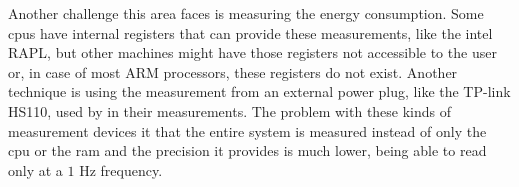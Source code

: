 Another challenge this area faces is measuring the energy consumption. Some \glspl{cpu} have internal registers that can provide these measurements, like the intel \gls{RAPL}, but other machines might have those registers not accessible to the user or, in case of most \gls{ARM} processors, these registers do not exist. Another technique is using the measurement from an external power plug, like the TP-link HS110, used by \textcite{meassuring-jit} in their measurements. The problem with these kinds of measurement devices it that the entire system is measured instead of only the \gls{cpu} or the \gls{ram} and the precision it provides is much lower, being able to read only at a $1$ Hz frequency. 

